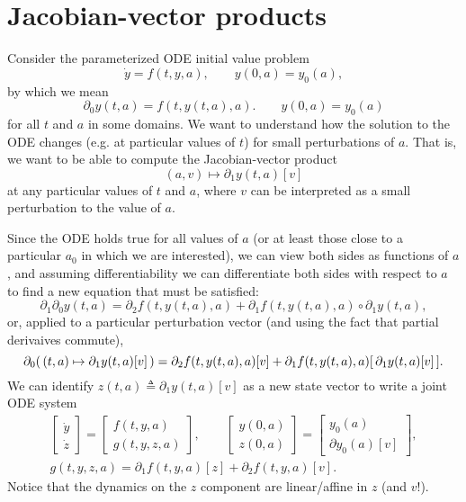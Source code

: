 \documentclass{article}
\begin{document}
\section{Jacobian-vector products}
Consider the parameterized ODE initial value problem
\begin{equation}
    \dot y = f(t, y, a), \qquad y(0, a) = y_0(a),
\end{equation}
by which we mean
\begin{equation}
    \partial_0 y(t, a) = f(t, y(t, a), a). \qquad y(0, a) = y_0(a)
\end{equation}
for all $t$ and $a$ in some domains.
We want to understand how the solution to the ODE changes (e.g. at particular
values of $t$) for small perturbations of $a$. That is, we want to be able to
compute the Jacobian-vector product
\begin{equation}
    (a, v) \mapsto \partial_1 y(t, a)[v]
\end{equation}
at any particular values of $t$ and $a$, where $v$ can be interpreted as a
small perturbation to the value of $a$.

Since the ODE holds true for all values of $a$ (or at least those close to a
particular $a_0$ in which we are interested), we can view both sides as
functions of $a$, and assuming differentiability we can differentiate both
sides with respect to $a$ to find a new equation that must be satisfied:
\begin{equation}
    \partial_1 \partial_0 y(t, a) = \partial_2 f(t, y(t, a), a) + \partial_1 f(t, y(t, a), a) \circ \partial_1 y(t, a),
\end{equation}
or, applied to a particular perturbation vector (and using the fact that partial derivaives commute),
\begin{equation}
    \partial_0 (\, (t, a) \mapsto \partial_1 y(t, a)[v] \,) = \partial_2 f(t, y(t, a), a)[v] + \partial_1 f(t, y(t, a), a) [ \, \partial_1 y(t, a)[v] \,].
    \notag
\end{equation}
We can identify $z(t, a) \triangleq \partial_1 y(t, a)[v]$ as a new state
vector to write a joint ODE system
\begin{gather}
    \begin{bmatrix}
        \dot y \\
        \dot z
    \end{bmatrix}
    =
    \begin{bmatrix}
        f(t, y, a) \\
        g(t, y, z, a)
    \end{bmatrix},
    \qquad
    \begin{bmatrix}
        y(0, a) \\
        z(0, a)
    \end{bmatrix}
    =
    \begin{bmatrix}
        y_0(a) \\
        \partial y_0(a)[v]
    \end{bmatrix},
    \\
    g(t, y, z, a) = \partial_1 f(t, y, a)[z] + \partial_2 f(t, y, a)[v].
\end{gather}
Notice that the dynamics on the $z$ component are linear/affine in $z$ (and $v$!).
\end{document}
